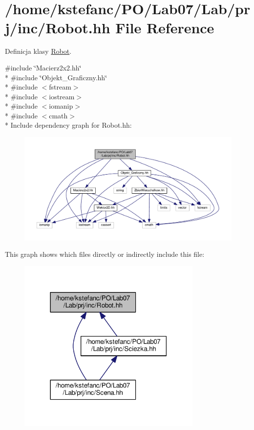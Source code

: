 \hypertarget{_robot_8hh}{\section{/home/kstefanc/\+P\+O/\+Lab07/\+Lab/prj/inc/\+Robot.hh File Reference}
\label{_robot_8hh}
}


Definicja klasy \hyperlink{class_robot}{Robot}.  


{\ttfamily \#include \char`\"{}Macierz2x2.\+hh\char`\"{}}\\*
{\ttfamily \#include \char`\"{}Objekt\+\_\+\+Graficzny.\+hh\char`\"{}}\\*
{\ttfamily \#include $<$fstream$>$}\\*
{\ttfamily \#include $<$iostream$>$}\\*
{\ttfamily \#include $<$iomanip$>$}\\*
{\ttfamily \#include $<$cmath$>$}\\*
Include dependency graph for Robot.\+hh\+:\nopagebreak
\begin{figure}[H]
\begin{center}
\leavevmode
\includegraphics[width=350pt]{_robot_8hh__incl}
\end{center}
\end{figure}
This graph shows which files directly or indirectly include this file\+:\nopagebreak
\begin{figure}[H]
\begin{center}
\leavevmode
\includegraphics[width=258pt]{_robot_8hh__dep__incl}
\end{center}
\end{figure}
